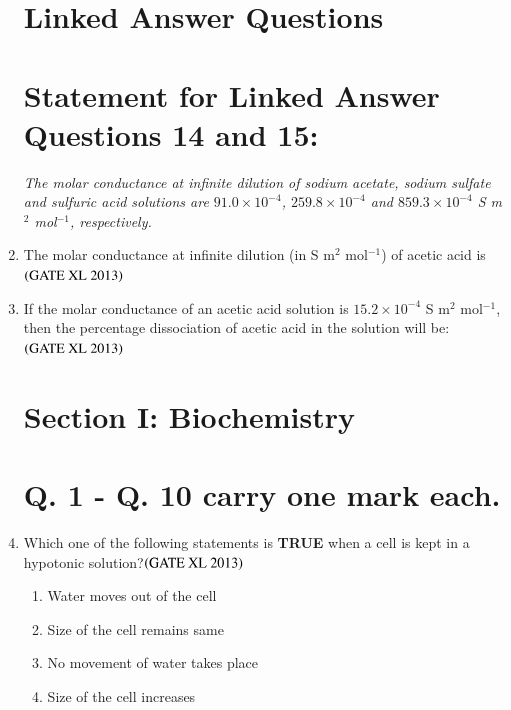 \documentclass[journal]{IEEEtran}
\begin{document}
\begin{enumerate}
\section*{Linked Answer Questions}
\section*{Statement for Linked Answer Questions 14 and 15: }

\noindent\textit{The molar conductance at infinite dilution of sodium acetate, sodium sulfate and sulfuric acid solutions are $91.0 \times 10^{-4}$, $259.8 \times 10^{-4}$ and $859.3 \times 10^{-4}$ S m$^2$ mol$^{-1}$, respectively.}

\item The molar conductance at infinite dilution (in S m$^2$ mol$^{-1}$) of acetic acid is\hfill $\left(\text{GATE XL 2013}\right)$
\begin{enumerate}
\end{enumerate}

\item If the molar conductance of an acetic acid solution is $15.2 \times 10^{-4}$ S m$^2$ mol$^{-1}$, then the percentage dissociation of acetic acid in the solution will be:\hfill $\left(\text{GATE XL 2013}\right)$
\begin{enumerate}
\end{enumerate}

\clearpage
\section*{Section I: Biochemistry}
\setcounter{enumi}{0}
\section*{Q. 1 - Q. 10 carry one mark each.}
\item Which one of the following statements is \textbf{TRUE} when a cell is kept in a hypotonic solution?\hfill $\left(\text{GATE XL 2013}\right)$
\begin{enumerate}
    \item Water moves out of the cell
    \item Size of the cell remains same
    \item No movement of water takes place
    \item Size of the cell increases
\end{enumerate}


\end{enumerate}
\end{document}
